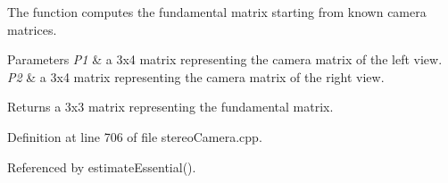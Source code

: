 The function computes the fundamental matrix starting from known camera matrices. 


\begin{DoxyParams}{Parameters}
{\em P1} & a 3x4 matrix representing the camera matrix of the left view. \\
\hline
{\em P2} & a 3x4 matrix representing the camera matrix of the right view. \\
\hline
\end{DoxyParams}
\begin{DoxyReturn}{Returns}
a 3x3 matrix representing the fundamental matrix. 
\end{DoxyReturn}


Definition at line 706 of file stereo\+Camera.\+cpp.



Referenced by estimate\+Essential().


